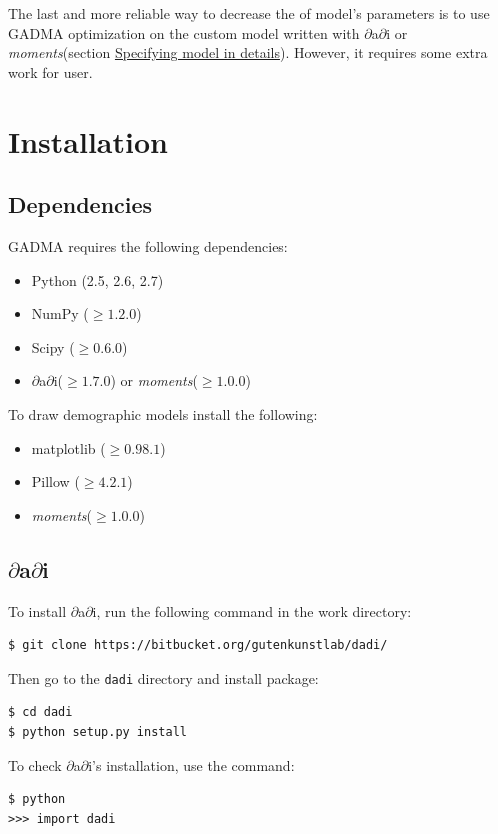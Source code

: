 \documentclass[12pt]{article}
\makeatletter
\newcommand{\dadi}{$\partial$a$\partial$i\xspace}
\newcommand{\moments}{\textit{moments}\xspace}
\newcommand{\py}[1]{\lstinline[language=Python, showstringspaces=False]@#1@}
\makeatother
\begin{document}
The last and more reliable way to decrease the of model's parameters is to use GADMA optimization on the custom model written with \dadi or \moments (section \hyperref[sec:spec-model-in-det]{Specifying model in details}). However, it requires some extra work for user.

\newpage
\section{Installation}

\subsection{Dependencies}
GADMA requires the following dependencies:
\begin{itemize}
    \item Python (2.5, 2.6, 2.7)
    \item NumPy ($\geq 1.2.0$)
    \item Scipy ($\geq 0.6.0$)
    \item \dadi ($\geq 1.7.0$) or \moments ($\geq 1.0.0$)
\end{itemize}
To draw demographic models install the following:
\begin{itemize}
    \item matplotlib ($\geq 0.98.1$)
    \item Pillow ($\geq 4.2.1$)
    \item \moments ($\geq 1.0.0$)
\end{itemize}

\subsection{\dadi}
To install \dadi, run the following command in the work directory:

\begin{lstlisting}
$ git clone https://bitbucket.org/gutenkunstlab/dadi/
\end{lstlisting}

Then go to the \py{dadi} directory and install package:

\begin{lstlisting}
$ cd dadi
$ python setup.py install
\end{lstlisting}

To check \dadi's installation, use the command:

\begin{lstlisting}
$ python
>>> import dadi
\end{lstlisting}
\end{document}
